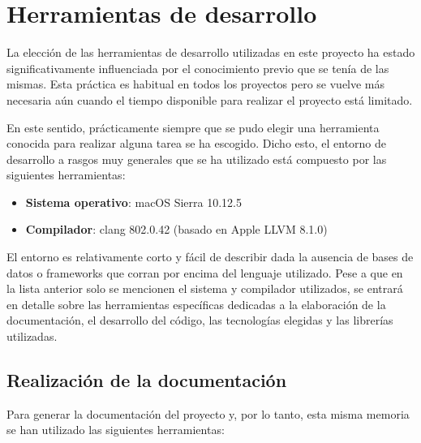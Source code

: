 \section{Herramientas de desarrollo}

La elección de las herramientas de desarrollo utilizadas en este proyecto ha estado significativamente influenciada por el conocimiento previo que se tenía de las mismas. Esta práctica es habitual en todos los proyectos pero se vuelve más necesaria aún cuando el tiempo disponible para realizar el proyecto está limitado.

\bigskip

En este sentido, prácticamente siempre que se pudo elegir una herramienta conocida para realizar alguna tarea se ha escogido. Dicho esto, el entorno de desarrollo a rasgos muy generales que se ha utilizado está compuesto por las siguientes herramientas:

\bigskip

\begin{itemize}
	\item \textbf{Sistema operativo}: macOS Sierra 10.12.5
	\item \textbf{Compilador}: clang 802.0.42 (basado en Apple LLVM 8.1.0)
\end{itemize}

\bigskip

El entorno es relativamente  corto y fácil de describir dada la ausencia de bases de datos o frameworks que corran por encima del lenguaje utilizado. Pese a que en la lista anterior solo se mencionen el sistema y compilador utilizados, se entrará en detalle sobre las herramientas específicas dedicadas a la elaboración de la documentación, el desarrollo del código, las tecnologías elegidas y las librerías utilizadas.

\subsection{Realización de la documentación}

Para generar la documentación del proyecto y, por lo tanto, esta misma memoria se han utilizado las siguientes herramientas:

